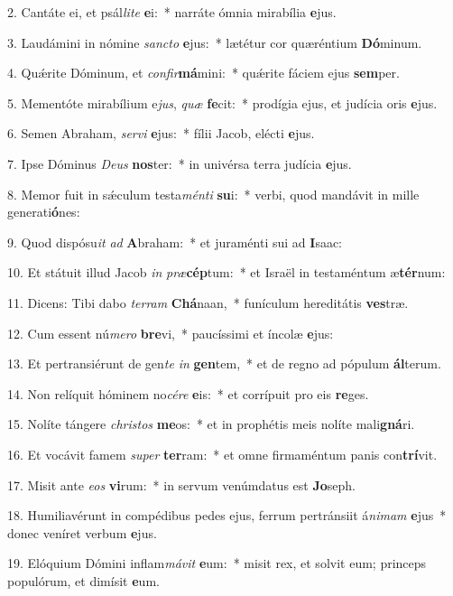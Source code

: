2. Cantáte ei, et psál\textit{li}\textit{te} \textbf{e}i:~*  narráte ómnia mirabília \textbf{e}jus.\

3. Laudámini in nómine \textit{sanc}\textit{to} \textbf{e}jus:~*  lætétur cor quæréntium \textbf{Dó}minum.\

4. Quǽrite Dóminum, et \textit{con}\textit{fir}\textbf{má}mini:~*  quǽrite fáciem ejus \textbf{sem}per.\

5. Mementóte mirabílium e\textit{jus}, \textit{quæ} \textbf{fe}cit:~*  prodígia ejus, et judícia oris \textbf{e}jus.\

6. Semen Abraham, \textit{ser}\textit{vi} \textbf{e}jus:~*  fílii Jacob, elécti \textbf{e}jus.\

7. Ipse Dóminus \textit{De}\textit{us} \textbf{nos}ter:~*  in univérsa terra judícia \textbf{e}jus.\

8. Memor fuit in sǽculum testa\textit{mén}\textit{ti} \textbf{su}i:~*  verbi, quod mandávit in mille generati\textbf{ó}nes:\

9. Quod dispósu\textit{it} \textit{ad} \textbf{A}braham:~*  et juraménti sui ad \textbf{I}saac:\

10. Et státuit illud Jacob \textit{in} \textit{præ}\textbf{cép}tum:~*  et Israël in testaméntum æ\textbf{tér}num:\

11. Dicens: Tibi dabo \textit{ter}\textit{ram} \textbf{Chá}naan,~*  funículum hereditátis \textbf{ves}træ.\

12. Cum essent nú\textit{me}\textit{ro} \textbf{bre}vi,~*  paucíssimi et íncolæ \textbf{e}jus:\

13. Et pertransiérunt de gen\textit{te} \textit{in} \textbf{gen}tem,~*  et de regno ad pópulum \textbf{ál}terum.\

14. Non relíquit hóminem no\textit{cé}\textit{re} \textbf{e}is:~*  et corrípuit pro eis \textbf{re}ges.\

15. Nolíte tángere \textit{chris}\textit{tos} \textbf{me}os:~*  et in prophétis meis nolíte mali\textbf{gná}ri.\

16. Et vocávit famem \textit{su}\textit{per} \textbf{ter}ram:~*  et omne firmaméntum panis con\textbf{trí}vit.\

17. Misit ante \textit{e}\textit{os} \textbf{vi}rum:~*  in servum venúmdatus est \textbf{Jo}seph.\

18. Humiliavérunt in compédibus pedes ejus, ferrum pertránsiit á\textit{ni}\textit{mam} \textbf{e}jus~*  donec veníret verbum \textbf{e}jus.\

19. Elóquium Dómini inflam\textit{má}\textit{vit} \textbf{e}um:~*  misit rex, et solvit eum; princeps populórum, et dimísit \textbf{e}um.\

